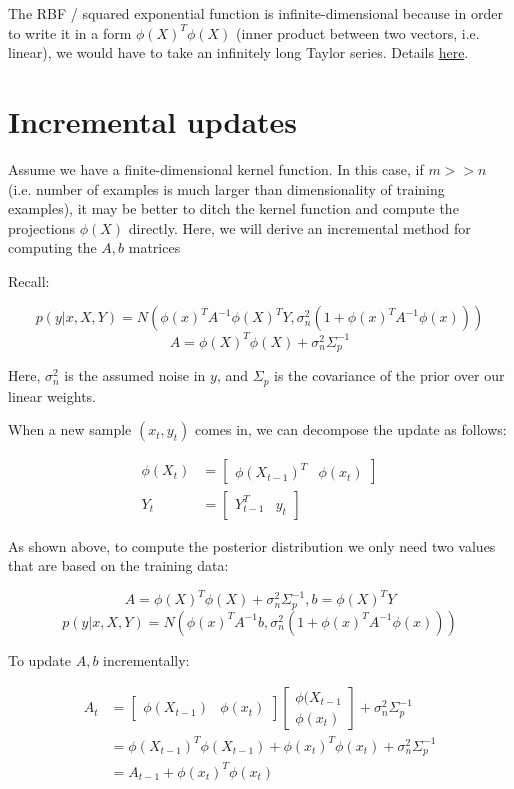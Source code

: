 \documentclass[a4paper]{article}
\begin{document}
The RBF / squared exponential function is infinite-dimensional because in order to write it in a form $\phi(X)^T \phi(X)$ (inner product between two vectors, i.e. linear), we would have to take an infinitely long Taylor series. Details \href{https://math.stackexchange.com/questions/1606110/what-is-an-example-of-a-svm-kernel-where-one-implicitly-uses-an-infinity-dimens/1620256#1620256}{here}.

\section{Incremental updates}

Assume we have a finite-dimensional kernel function. In this case, if $m>>n$ (i.e. number of examples is much larger than dimensionality of training examples), it may be better to ditch the kernel function and compute the projections $\phi(X)$ directly. Here, we will derive an incremental method for computing the $A,b$ matrices

Recall:

$$p(y | x, X, Y) = N(\phi(x)^T A^{-1} \phi(X)^T Y, \sigma_n^2 (1 +\phi(x)^T A^{-1} \phi(x)))$$
$$A = \phi(X)^T \phi(X) + \sigma_n^2 \Sigma_p^{-1}$$

Here, $\sigma_n^2$ is the assumed noise in $y$, and $\Sigma_p$ is the covariance of the prior over our linear weights.

When a new sample $(x_t, y_t)$ comes in, we can decompose the update as follows:

\begin{align*}
\phi(X_t) &= \begin{bmatrix}\phi(X_{t-1})^T & \phi(x_t) \end{bmatrix} \\
Y_t &= \begin{bmatrix}Y_{t-1}^T & y_t \end{bmatrix}
\end{align*}

As shown above, to compute the posterior distribution we only need two values that are based on the training data:

$$A = \phi(X)^T \phi(X) + \sigma_n^2 \Sigma_p^{-1}, b = \phi(X)^T Y$$
$$p(y | x, X, Y) = N(\phi(x)^T A^{-1} b, \sigma_n^2 (1 +\phi(x)^T A^{-1} \phi(x)))$$

To update $A,b$ incrementally:

\begin{align*}
A_t &= \begin{bmatrix} \phi(X_{t-1}) & \phi(x_t) \end{bmatrix} \begin{bmatrix} \phi(X_{t-1} \\ \phi(x_t) \end{bmatrix} + \sigma_n^2 \Sigma_p^{-1} \\
&= \phi(X_{t-1})^T\phi(X_{t-1}) + \phi(x_t)^T \phi(x_t) + \sigma_n^2 \Sigma_p^{-1} \\
&= A_{t-1} + \phi(x_t)^T \phi(x_t)
\end{align*}
\end{document}
